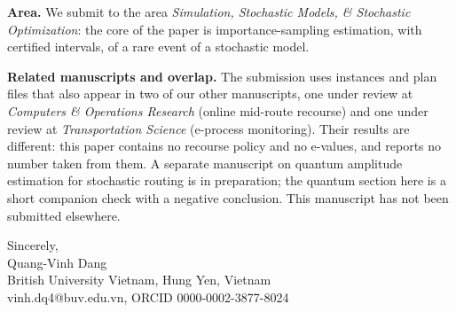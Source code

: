 \documentclass[10pt]{article}
\begin{document}
\textbf{Area.} We submit to the area \emph{Simulation, Stochastic Models, \& Stochastic Optimization}: the core of the paper is importance-sampling estimation, with certified intervals, of a rare event of a stochastic model.

\textbf{Related manuscripts and overlap.} The submission uses instances and plan files that also appear in two of our other manuscripts, one under review at \emph{Computers \& Operations Research} (online mid-route recourse) and one under review at \emph{Transportation Science} (e-process monitoring). Their results are different: this paper contains no recourse policy and no e-values, and reports no number taken from them. A separate manuscript on quantum amplitude estimation for stochastic routing is in preparation; the quantum section here is a short companion check with a negative conclusion. This manuscript has not been submitted elsewhere.

Sincerely,\\[0.3em]
Quang-Vinh Dang\\
British University Vietnam, Hung Yen, Vietnam\\
vinh.dq4@buv.edu.vn, ORCID 0000-0002-3877-8024
\end{document}
